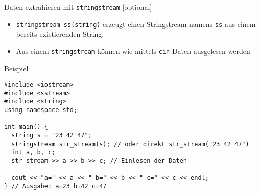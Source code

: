 \documentclass[presentation]{beamer}
\begin{document}
\begin{frame}[label={sec:org2b9b51f},fragile]{Daten extrahieren mit {\color{solarizedYellow}\texttt{stringstream}} [optional]}
 \begin{itemize}
\item {\color{solarizedYellow}\verb!stringstream ss(string)!} erzeugt einen Stringstream namens {\color{solarizedYellow}\verb!ss!} aus
einem bereits existierenden String.
\item Aus einem {\color{solarizedYellow}\verb!stringstream!} können wie mittels {\color{solarizedYellow}\verb!cin!} Daten ausgelesen
werden
\end{itemize}
\begin{exampleblock}{Beispiel}
\begin{verbatim}
#include <iostream>
#include <sstream>
#include <string>
using namespace std;

int main() {
  string s = "23 42 47";
  stringstream str_stream(s); // oder direkt str_stream("23 42 47")
  int a, b, c;
  str_stream >> a >> b >> c; // Einlesen der Daten

  cout << "a=" << a << " b=" << b << " c=" << c << endl;
} // Ausgabe: a=23 b=42 c=47
\end{verbatim}
\end{exampleblock}
\end{frame}
\end{document}
